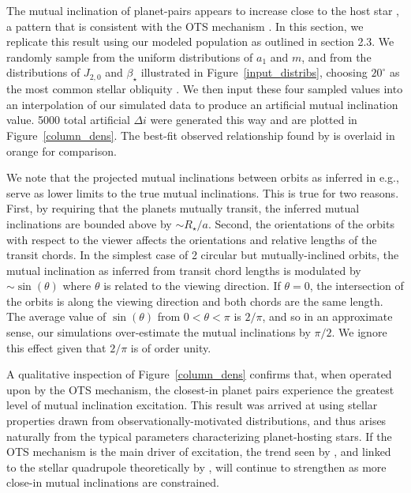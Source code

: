 \documentclass[twocolumn]{aastex63}
\begin{document}
The mutual inclination of planet-pairs appears to increase close to the host star \citep{dai2018larger}, a pattern that is consistent with the OTS mechanism \citep{li2020mutual}. In this section, we replicate this result using our modeled population as outlined in section 2.3. 
We randomly sample from the uniform distributions of \(a_1\) and \(m\), and from the
distributions of $J_{2,0}$ and $\beta_\star$ illustrated in Figure~\ref{input_distribs}, choosing $20^\circ$ as the most common stellar obliquity  \citep{winn2017constraints}. We then input these four sampled values into an interpolation of our simulated data to produce an artificial mutual inclination value. 5000 total artificial \(\Delta i\) were generated this way and are plotted in Figure~\ref{column_dens}. The best-fit observed relationship found by \citet{dai2018larger} is overlaid in orange for comparison.

We note that the projected mutual inclinations between orbits as inferred in e.g., \citet{dai2018larger} serve as lower limits to the true mutual inclinations. This is true for two reasons. First, by requiring that the planets mutually transit, the inferred mutual inclinations are bounded above by $\sim R_\star/a$. Second, the orientations of the orbits with respect to the viewer affects the orientations and relative lengths of the transit chords. In the simplest case of 2 circular but mutually-inclined orbits, the mutual inclination as inferred from transit chord lengths is modulated by $\sim\sin(\theta)$ where $\theta$ is related to the viewing direction. If $\theta=0$, the intersection of the orbits is along the viewing direction and both chords are the same length. The average value of $\sin(\theta)$ from $0<\theta<\pi$ is $2/\pi$, and so in an approximate sense, our simulations over-estimate the  mutual inclinations by $\pi/2$. We ignore this effect given that $2/\pi$ is of order unity.

A qualitative inspection of Figure~\ref{column_dens} confirms that, when operated upon by the OTS mechanism, the closest-in planet pairs experience the greatest level of mutual inclination excitation. This result was arrived at using stellar properties drawn from observationally-motivated distributions, and thus arises naturally from the typical parameters characterizing planet-hosting stars. If the OTS mechanism is the main driver of excitation, the trend seen by \cite{dai2018larger}, and linked to the stellar quadrupole theoretically by \citet{li2020mutual}, will continue to strengthen as more close-in mutual inclinations are constrained.
\end{document}
